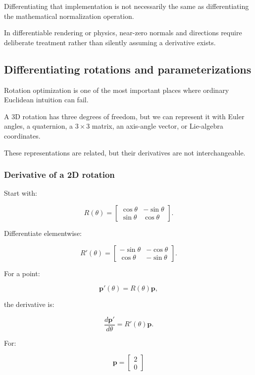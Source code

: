 Differentiating that implementation is not necessarily the same as differentiating the mathematical normalization operation.

In differentiable rendering or physics, near-zero normals and directions require deliberate treatment rather than silently assuming a derivative exists.

\subsection{Differentiating rotations and parameterizations}\label{02-foundations-ii-ch027-differentiating-rotations-and-parameterizations}

Rotation optimization is one of the most important places where ordinary Euclidean intuition can fail.

A 3D rotation has three degrees of freedom, but we can represent it with Euler angles, a quaternion, a \(3\times3\) matrix, an axis-angle vector, or Lie-algebra coordinates.

These representations are related, but their derivatives are not interchangeable.

\subsubsection{Derivative of a 2D rotation}\label{02-foundations-ii-ch027-derivative-of-a-2d-rotation}

Start with:

\[
R(\theta)= \begin{bmatrix} \cos\theta&-\sin\theta\\ \sin\theta&\cos\theta \end{bmatrix}.
\]

Differentiate elementwise:

\[
\boxed{ R'(\theta)= \begin{bmatrix} -\sin\theta&-\cos\theta\\ \cos\theta&-\sin\theta \end{bmatrix} }.
\]

For a point:

\[
\mathbf p'(\theta)=R(\theta)\mathbf p,
\]

the derivative is:

\[
\boxed{ \frac{d\mathbf p'}{d\theta} = R'(\theta)\mathbf p }.
\]

For:

\[
\mathbf p= \begin{bmatrix} 2\\0 \end{bmatrix}
\]

